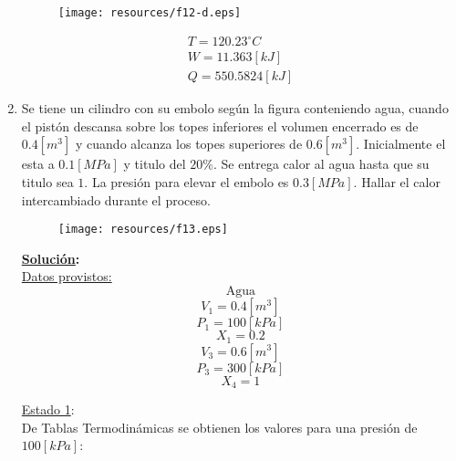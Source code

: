 \documentclass[letter,11pt]{article}
\begin{document}
\begin{enumerate}
\begin{figure}[H]
\centering
\texttt{[image: resources/f12-d.eps]}
\end{figure}

\begin{equation*}
\boxed{
    \begin{array}{l}
        T = 120.23^\circ C \\
        W = 11.363[kJ] \\
        Q = 550.5824[kJ]
    \end{array}
}
\end{equation*}
\newpage

\item Se tiene un cilindro con su embolo según la figura conteniendo agua,
cuando el pistón descansa sobre los topes inferiores el volumen encerrado es de
$0.4[m^3]$ y cuando alcanza los topes superiores de $0.6[m^3]$. Inicialmente el
esta a $0.1[MPa]$ y titulo del $20\%$. Se entrega calor al agua hasta que su
titulo sea $1$. La presión para elevar el embolo es $0.3[MPa]$. Hallar el calor
intercambiado durante el proceso.

\begin{figure}[H]
\centering
\texttt{[image: resources/f13.eps]}
\end{figure}

\textbf{\underline{Solución}:} \\

\underline{Datos provistos:}
\begin{equation*}
    \text{Agua}
\end{equation*}
\begin{equation*}
    V_1 = 0.4[m^3]
\end{equation*}
\begin{equation*}
    P_1 = 100[kPa]
\end{equation*}
\begin{equation*}
    X_1 = 0.2
\end{equation*}
\begin{equation*}
    V_3 = 0.6[m^3]
\end{equation*}
\begin{equation*}
    P_3 = 300[kPa]
\end{equation*}
\begin{equation*}
    X_4 = 1
\end{equation*}

\underline{Estado 1}: \\
De Tablas Termodinámicas se obtienen los valores para una presión de
$100[kPa]$:


\end{enumerate}
\end{document}
